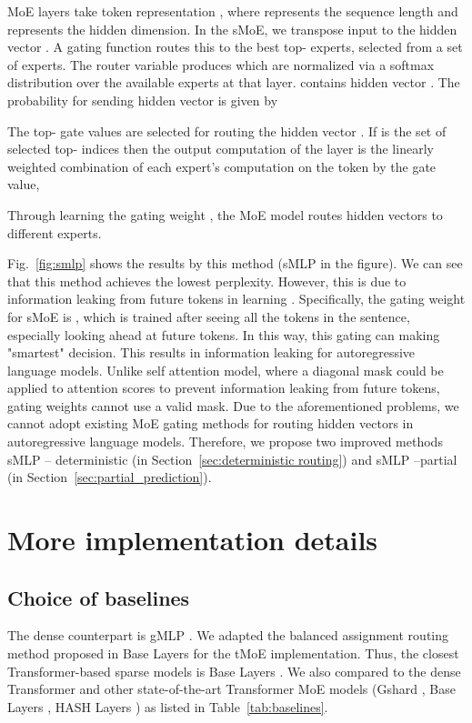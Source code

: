 \documentclass{article}
\begin{document}
MoE layers take token representation , where  represents the sequence length and  represents the hidden dimension. In the sMoE, we transpose input to the hidden vector . A gating function routes this to the best top- experts, selected from a set  of  experts. The router variable  produces  which are normalized via a softmax distribution over the available  experts at that layer.  contains  hidden vector . The probability for sending  hidden vector is given by

The top- gate values are selected for routing the hidden vector . If  is the set of selected top- indices then the output computation of the layer is the linearly weighted combination of each expert's computation on the token by the gate value,


Through learning the gating weight , the MoE model routes hidden vectors to different experts. 

Fig.~\ref{fig:smlp} shows the results by this method (sMLP in the figure). We can see that this method achieves the lowest perplexity. However, this is due to information leaking from future tokens in learning . Specifically, the gating weight for sMoE is , which is trained after seeing all the tokens in the sentence, especially looking ahead at future tokens. In this way, this gating can making "smartest" decision.
This results in information leaking for autoregressive language models. Unlike self attention model, where a diagonal mask could be applied to attention scores   to prevent information leaking from future tokens, gating weights  cannot use a valid mask. Due to the aforementioned problems, we cannot adopt existing MoE gating methods for routing hidden vectors in autoregressive language models. Therefore, we propose two improved methods sMLP -- deterministic (in Section~\ref{sec:deterministic routing}) and sMLP --partial (in Section~\ref{sec:partial_prediction}).





\section{More implementation details}
\label{sec:more_experiments}


\subsection{Choice of baselines}
\label{sec:app_baselines}
The dense counterpart is gMLP \citep{gmlp}. We adapted the balanced assignment routing method proposed in Base Layers \citep{baselayer} for the tMoE implementation. Thus, the closest Transformer-based sparse models is Base Layers \citep{baselayer}. We also compared to the dense Transformer \citep{vaswani2017attention} and other state-of-the-art Transformer MoE models (Gshard \citep{gshard}, Base Layers \citep{baselayer}, HASH Layers \citep{hashlayer}) as listed in Table~\ref{tab:baselines}.
\end{document}
